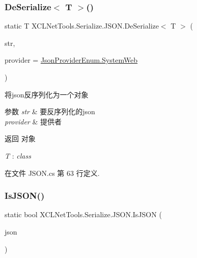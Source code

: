 \subsubsection{\texorpdfstring{De\+Serialize$<$ T $>$()}{DeSerialize< T >()}}
{\footnotesize\ttfamily static T X\+C\+L\+Net\+Tools.\+Serialize.\+J\+S\+O\+N.\+De\+Serialize$<$ T $>$ (\begin{DoxyParamCaption}\item[{string}]{str,  }\item[{\hyperlink{class_x_c_l_net_tools_1_1_serialize_1_1_j_s_o_n_acb00f7258e4dedfaa0cec15ce9335a31}{Json\+Provider\+Enum}}]{provider = {\ttfamily \hyperlink{class_x_c_l_net_tools_1_1_serialize_1_1_j_s_o_n_acb00f7258e4dedfaa0cec15ce9335a31a67a1b1b70420ea0e3be332a9dedcb83e}{Json\+Provider\+Enum.\+System\+Web}} }\end{DoxyParamCaption})\hspace{0.3cm}{\ttfamily [static]}}



将json反序列化为一个对象 


\begin{DoxyParams}{参数}
{\em str} & 要反序列化的json\\
\hline
{\em provider} & 提供者\\
\hline
\end{DoxyParams}
\begin{DoxyReturn}{返回}
对象
\end{DoxyReturn}
\begin{Desc}
\item[类型限制]\begin{description}
\item[{\em T} : {\em class}]\end{description}
\end{Desc}


在文件 J\+S\+O\+N.\+cs 第 63 行定义.

\mbox{\label{class_x_c_l_net_tools_1_1_serialize_1_1_j_s_o_n_afa66781755a8dc2088b5f03cfd82d9e9}} 
\subsubsection{\texorpdfstring{Is\+J\+S\+O\+N()}{IsJSON()}}
{\footnotesize\ttfamily static bool X\+C\+L\+Net\+Tools.\+Serialize.\+J\+S\+O\+N.\+Is\+J\+S\+ON (\begin{DoxyParamCaption}\item[{string}]{json }\end{DoxyParamCaption})\hspace{0.3cm}{\ttfamily [static]}}



